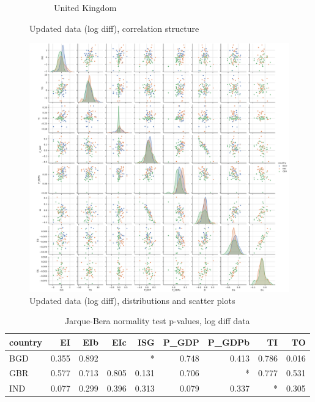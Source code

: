 \documentclass[11pt,a4paper]{article}
\begin{document}
\begin{figure}[htbp]
\begin{subfigure}{0.7\textwidth}
\caption{United Kingdom}
\end{subfigure}
\caption{Updated data (log diff), correlation structure}
\label{fig:logdiff_correlations}
\end{figure}

\clearpage

\begin{figure}[htbp]
\centering
\includegraphics[width=\textwidth]{./plots/logdiff_pairplot.pdf}
\caption{Updated data (log diff), distributions and scatter plots}
\label{fig:logdiff_scatterplot}
\end{figure}

\begin{table}[htbp]
\centering
\begin{tabular}{lrrrrrrrr}
\toprule
country &    EI &   EIb &   EIc &   ISG &  P\_GDP &  P\_GDPb &    TI &    TO \\
\midrule
    BGD & 0.355 & 0.892 &       &     * &  0.748 &   0.413 & 0.786 & 0.016 \\
    GBR & 0.577 & 0.713 & 0.805 & 0.131 &  0.706 &       * & 0.777 & 0.531 \\
    IND & 0.077 & 0.299 & 0.396 & 0.313 &  0.079 &   0.337 &     * & 0.305 \\
\bottomrule
\end{tabular}
\caption{Jarque-Bera normality test p-values, log diff data}
\label{tab:normality_test}
\end{table}
\end{document}

